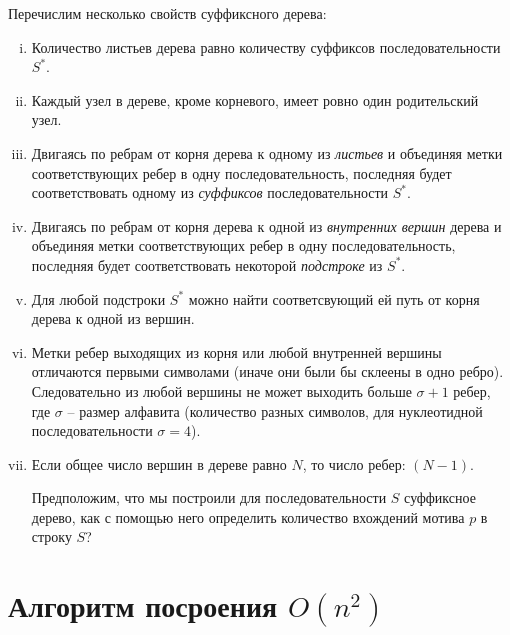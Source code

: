 \documentclass[letterpaper, 11pt]{article}
\begin{document}
\clearpage
Перечислим несколько свойств суффиксного дерева:
\begin{enumerate}[(i)]
\item
Количество листьев дерева равно количеству суффиксов последовательности $S^*$.
\item
Каждый узел в дереве, кроме корневого, имеет ровно один родительский узел.
\item
Двигаясь по ребрам от корня дерева к одному из \textit{листьев} и объединяя метки соответствующих ребер в одну последовательность, последняя будет соответствовать одному из \textit{суффиксов} последовательности $S^*$.
\item
Двигаясь по ребрам от корня дерева к одной из \textit{внутренних вершин} дерева и объединяя метки соответствующих ребер в одну последовательность, последняя будет соответствовать некоторой \textit{подстроке} из $S^*$.
\item
Для любой подстроки $S^*$ можно найти соответсвующий ей путь от корня дерева к одной из вершин.
\item
Метки ребер выходящих из корня или любой внутренней вершины отличаются первыми символами (иначе они были бы склеены в одно ребро). Следовательно из любой вершины не может выходить больше $\sigma + 1$ ребер, где $\sigma$ -- размер алфавита (количество разных символов, для нуклеотидной последовательности $\sigma = 4$).
\item
Если общее число вершин в дереве равно $N$, то число ребер: $(N - 1)$.

Предположим, что мы построили для последовательности $S$ суффиксное дерево, как с помощью него определить количество вхождений мотива $p$ в строку $S$?
\end{enumerate}

\clearpage
\section{Алгоритм посроения $O(n^2)$}
\par
\end{document}
